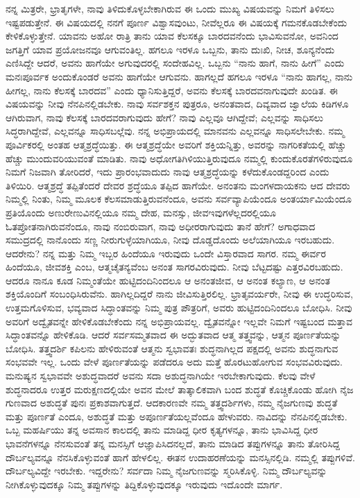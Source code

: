 ನನ್ನ ಮಿತ್ರರೇ, ಭ್ರಾತೃಗಳೇ, ನಾವು ತಿಳಿದುಕೊಳ್ಳಬೇಕಾಗಿರುವ ಈ ಒಂದು ಮುಖ್ಯ ವಿಷಯವನ್ನು ನಿಮಗೆ ತಿಳಿಸಲು ಇಷ್ಟಪಡುತ್ತೇನೆ. ಈ ವಿಷಯದಲ್ಲಿ ನನಗೆ ಪೂರ್ಣ ವಿಶ್ವಾಸವುಂಟು, ನೀವೆಲ್ಲರೂ ಈ ವಿಷಯಕ್ಕೆ ಗಮನಕೊಡಬೇಕೆಂದು ಕೇಳಿಕೊಳ್ಳುತ್ತೇನೆ. ಯಾವನು ಅಹೋ ರಾತ್ರಿ ತಾನು ಯಾವ ಕೆಲಸಕ್ಕೂ ಬಾರದವನೆಂದು ಭಾವಿಸುವನೋ, ಅವನಿಂದ ಜಗತ್ತಿಗೆ ಯಾವ ಪ್ರಯೋಜನವೂ ಆಗುವಂತಿಲ್ಲ. ಹಗಲೂ ಇರಳೂ ಒಬ್ಬನು, ತಾನು ದುಃಖಿ, ನೀಚ, ಶೂನ್ಯನೆಂದು ಎಣಿಸಿದ್ದೇ ಆದರೆ, ಅವನು ಹಾಗೆಯೇ ಅಗುವುದರಲ್ಲಿ ಸಂದೇಹವಿಲ್ಲ. ಒಬ್ಬನು “ನಾನು ಹಾಗೆ, ನಾನು ಹೀಗೆ” ಎಂದು ಮನಃಪೂರ್ವಕ ಅಂದುಕೊಂಡರೆ ಅವನು ಹಾಗೆಯೇ ಆಗುವನು. ಹಾಗಲ್ಲದೆ ಹಗಲೂ ಇರಳೂ “ನಾನು ಹಾಗಲ್ಲ, ನಾನು ಹೀಗಲ್ಲ, ನಾನು ಕೆಲಸಕ್ಕೆ ಬಾರದವ” ಎಂದು ಧ್ಯಾನಿಸುತ್ತಿದ್ದರೆ, ಅವನು ಕೆಲಸಕ್ಕೆ ಬಾರದವನಾಗುವುದೇ ಖಂಡಿತ. ಈ ವಿಷಯವನ್ನು ನೀವು ನೆನಪಿನಲ್ಲಿಡಬೇಕು. ನಾವು ಸರ್ವಶಕ್ತನ ಪುತ್ರರೂ, ಅನಂತವಾದ, ದಿವ್ಯವಾದ ಜ್ವಾಲೆಯ ಕಿಡಿಗಳೂ ಆಗಿರುವಾಗ, ನಾವು ಕೆಲಸಕ್ಕೆ ಬಾರದವರಾಗುವುದು ಹೇಗೆ? ನಾವು ಎಲ್ಲವೂ ಆಗಿದ್ದೇವೆ; ಎಲ್ಲವನ್ನು ಸಾಧಿಸಲು ಸಿದ್ಧರಾಗಿದ್ದೇವೆ, ಎಲ್ಲವನ್ನೂ ಸಾಧಿಸಬಲ್ಲೆವು. ನನ್ನ ಅಭಿಪ್ರಾಯದಲ್ಲಿ ಮಾನವನು ಎಲ್ಲವನ್ನೂ ಸಾಧಿಸಲೇಬೇಕು. ನಮ್ಮ ಪೂರ್ವಿಕರಲ್ಲಿ ಅಂತಹ ಆತ್ಮಶ್ರದ್ಧೆಯಿತ್ತು. ಈ ಆತ್ಮಶ್ರದ್ಧೆಯೇ ಅವರಿಗೆ ಶಕ್ತಿಯನ್ನಿತ್ತು, ಅವರನ್ನು ನಾಗರಿಕತೆಯಲ್ಲಿ ಹೆಚ್ಚು ಹೆಚ್ಚು ಮುಂದುವರಿಯುವಂತೆ ಮಾಡಿತು. ನಾವು ಅಧೋಗತಿಗಿಳಿಯುತ್ತಿರುವುದೂ ನಮ್ಮಲ್ಲಿ ಕುಂದುಕೊರತೆಗಳಿರುವುದೂ ನಿಮಗೆ ನಿಜವಾಗಿ ತೋರಿದರೆ, ಇದು ಪ್ರಾರಂಭವಾದುದು ನಾವು ಆತ್ಮಶ್ರದ್ಧೆಯನ್ನು ಕಳೆದುಕೊಂಡದ್ದರಿಂದ ಎಂದು ತಿಳಿಯಿರಿ. ಆತ್ಮಶ್ರದ್ಧೆ ತಪ್ಪಿತೆಂದರೆ ದೇವರ ಶ್ರದ್ಧೆಯೂ ತಪ್ಪಿದ ಹಾಗೆಯೇ. ಅನಂತನು ಮಂಗಳದಾಯಕನು ಆದ ದೇವರು ನಿಮ್ಮಲ್ಲಿ ನಿಂತು, ನಿಮ್ಮ ಮೂಲಕ ಕೆಲಸಮಾಡುತ್ತಿರುವನೆಂದೂ, ಅವನು ಸರ್ವವ್ಯಾಪಿಯೆಂದೂ ಅಂತರ್ಯಾಮಿಯೆಂದೂ ಪ್ರತಿಯೊಂದು ಅಣುರೇಣುವಿನಲ್ಲಿಯೂ ನಮ್ಮ ದೇಹ, ಮನಸ್ಸು, ಜೀವ\break ಇವುಗಳೆಲ್ಲದರಲ್ಲಿಯೂ ಓತಪ್ರೋತನಾಗಿರುವನೆಂದೂ, ನಾವು ನಂಬಿರುವಾಗ, ನಾವು ಅಧೀರರಾಗುವುದು ತಾನೆ ಹೇಗೆ? ಅಗಾಧವಾದ ಸಮುದ್ರದಲ್ಲಿ ನಾನೊಂದು ಸಣ್ಣ ನೀರುಗುಳ್ಳೆಯಾಗಿಯೂ, ನೀವು ದೊಡ್ಡದೊಂದು ಅಲೆಯಾಗಿಯೂ ಇರಬಹುದು. ಆದರೇನು? ನನ್ನ ಮತ್ತು ನಿಮ್ಮ ಇಬ್ಬರ ಹಿಂದೆಯೂ ಇರುವುದು ಒಂದೇ ವಿಸ್ತಾರವಾದ ಸಾಗರ. ನಮ್ಮ ಈರ್ವರ ಹಿಂದೆಯೂ, ಜೀವಶಕ್ತಿ ಎಂಬ, ಆತ್ಮಚೈತನ್ಯವೆಂಬ ಅನಂತ ಸಾಗರವಿರುವುದು. ನೀವು ಬೆಟ್ಟದಷ್ಟು ಎತ್ತರವಿರಬಹುದು. ಆದರೂ ನಾನೂ ಕೂಡ ನಿಮ್ಮಂತೆಯೇ ಹುಟ್ಟಿದಂದಿನಿಂದಲೂ ಆ ಅನಂತಜೀವ, ಆ ಅನಂತ ಕಲ್ಯಾಣ, ಆ ಅನಂತ ಶಕ್ತಿಯೊಂದಿಗೆ ಸಂಬಂಧಿಸಿರುವೆನು. ಹಾಗಿಲ್ಲದಿದ್ದರೆ ನಾನು ಜೀವಿಸುತ್ತಿರಲಿಲ್ಲ. ಭ್ರಾತೃವರ್ಯರೇ, ನೀವು ಈ ಉದ್ಧರಿಸುವ, ಉತ್ತಮಗೊಳಿಸುವ, ಭವ್ಯವಾದ ಸಿದ್ಧಾಂತವನ್ನು ನಿಮ್ಮ ಪುತ್ರ ಪೌತ್ರರಿಗೆ, ಅವರು ಹುಟ್ಟಿದಂದಿನಿಂದಲೂ ಬೋಧಿಸಿ. ನೀವು ಅವರಿಗೆ ಅದ್ವೈತವನ್ನೇ ಹೇಳಿಕೊಡಬೇಕೆಂದು ನನ್ನ ಅಭಿಪ್ರಾಯವಲ್ಲ. ದ್ವೈತವನ್ನೋ ಇಲ್ಲವೇ ನಿಮಗೆ ಇಷ್ಟಬಂದ ಮತ್ತಾವ ಸಿದ್ಧಾಂತವನ್ನೊ ಹೇಳಿಕೊಡಿ. ಆದರೆ ಸರ್ವಸಮ್ಮತವಾದ ಈ ಅದ್ಭುತವಾದ ಆತ್ಮ ತತ್ತ್ವವನ್ನು, ಆತ್ಮನ ಪೂರ್ಣತೆಯನ್ನು ಬೋಧಿಸಿ. ತತ್ತ್ವದರ್ಶಿ ಕಪಿಲನು ಹೇಳಿರುವಂತೆ ಆತ್ಮನು ಸ್ವಭಾವತಃ ಶುದ್ಧನಾಗಿಲ್ಲದ ಪಕ್ಷದಲ್ಲಿ ಅವನು ಶುದ್ಧನಾಗುವ ಸಂಭವವೇ ಇಲ್ಲ. ಒಂದು ವೇಳೆ ಪೂರ್ಣತೆಯನ್ನು ಪಡೆದರೂ ಅದು ಮತ್ತೆ ಹೊರಟುಹೋಗುವ ಸಂಭವವಿರುವುದು. ಮನುಷ್ಯನ ಸ್ವಭಾವವೇ ಅಶುದ್ಧವಾದರೆ ಅವನು ಸದಾ ಅಶುದ್ಧನಾಗಿಯೇ ಇರಬೇಕಾಗುವುದು. ಕೆಲವು ವೇಳೆ ಶುದ್ಧನಾದರೂ ಉತ್ತರ ಮರುಕ್ಷಣದಲ್ಲಿಯೇ ಅವನ ಮೇಲೆ ತಾತ್ಕಾಲಿಕವಾಗಿ ಬಂದ ಶುದ್ಧತೆ ಕೊಚ್ಚಿಕೊಂಡು ಹೋಗಿ ನೈಜ ಗುಣವಾದ ಅಶುದ್ಧತೆ ಪುನಃ ಪ್ರಕಾಶವಾಗುತ್ತದೆ. ಆದಕಾರಣವೇ ನಮ್ಮ ತತ್ತ್ವದರ್ಶಿಗಳು, ನಮ್ಮ ನೈಜಗುಣವು ಶುದ್ಧತೆ ಮತ್ತು ಪೂರ್ಣತೆ ಎಂದೂ, ಅಶುದ್ಧತೆ ಮತ್ತು ಅಪೂರ್ಣತೆಯಲ್ಲವೆಂದೂ ಹೇಳುವರು. ನಾವಿದನ್ನು ನೆನಪಿನಲ್ಲಿಡಬೇಕು. ಒಬ್ಬ ಮಹರ್ಷಿಯು ತನ್ನ ಅವಸಾನ ಕಾಲದಲ್ಲಿ ತಾನು ಮಾಡಿದ್ದ ಧೀರ ಕೃತ್ಯಗಳನ್ನೂ, ತಾನು ಭಾವಿಸಿದ್ದ ಧೀರ ಭಾವನೆಗಳನ್ನೂ ನೆನಸುವಂತೆ ತನ್ನ ಮನಸ್ಸಿಗೆ ಆಜ್ಞಾಪಿಸಿದನಲ್ಲದೆ, ತಾನು ಮಾಡಿದ ತಪ್ಪುಗಳನ್ನೂ ತಾನು ತೋರಿಸಿದ್ದ ದೌರ್ಬಲ್ಯವನ್ನೂ ನೆನಸಿಕೊಳ್ಳುವಂತೆ ಹಾಗೆ ಹೇಳಲಿಲ್ಲ. ಈತನ ಉದಾಹರಣೆಯನ್ನು ಮನಸ್ಸಿನಲ್ಲಿಡಿ. ನಮ್ಮಲ್ಲಿ ತಪ್ಪುಗಳಿವೆ. ದೌರ್ಬಲ್ಯವಿದ್ದೇ ಇರಬೇಕು. ಇದ್ದರೇನು? ಸರ್ವದಾ ನಿಮ್ಮ ನೈಜಗುಣವನ್ನು ಸ್ಮರಿಸಿಕೊಳ್ಳಿ. ನಿಮ್ಮ ದೌರ್ಬಲ್ಯವನ್ನು ನೀಗಿಕೊಳ್ಳುವುದಕ್ಕೂ ನಿಮ್ಮ ತಪ್ಪುಗಳನ್ನು ತಿದ್ದಿಕೊಳ್ಳುವುದಕ್ಕೂ ಇರುವುದು ಇದೊಂದೇ ಮಾರ್ಗ.

